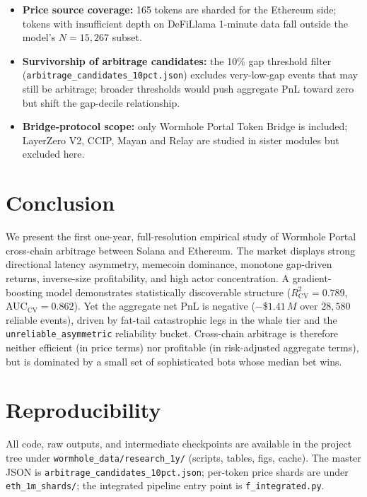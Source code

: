 \documentclass[11pt,a4paper]{article}
\begin{document}
\begin{itemize}
    \item \textbf{Price source coverage:} 165 tokens are sharded for the
        Ethereum side; tokens with insufficient depth on DeFiLlama 1-minute
        data fall outside the model's $N=15{,}267$ subset.
    \item \textbf{Survivorship of arbitrage candidates:} the 10\% gap
        threshold filter (\texttt{arbitrage\_candidates\_10pct.json}) excludes
        very-low-gap events that may still be arbitrage; broader thresholds
        would push aggregate PnL toward zero but shift the gap-decile
        relationship.
    \item \textbf{Bridge-protocol scope:} only Wormhole Portal Token Bridge
        is included; LayerZero V2, CCIP, Mayan and Relay are studied in
        sister modules but excluded here.
\end{itemize}

\section{Conclusion}\label{sec:conc}

We present the first one-year, full-resolution empirical study of Wormhole
Portal cross-chain arbitrage between Solana and Ethereum. The market displays
strong directional latency asymmetry, memecoin dominance, monotone
gap-driven returns, inverse-size profitability, and high actor concentration.
A gradient-boosting model demonstrates statistically discoverable structure
($R^{2}_{\text{CV}}=0.789$, AUC$_{\text{CV}}=0.862$). Yet the aggregate net
PnL is negative ($-\$1.41\,M$ over $28{,}580$ reliable events), driven by
fat-tail catastrophic legs in the whale tier and the
\texttt{unreliable\_asymmetric} reliability bucket. Cross-chain arbitrage is
therefore neither efficient (in price terms) nor profitable (in
risk-adjusted aggregate terms), but is dominated by a small set of
sophisticated bots whose median bet wins.

\section*{Reproducibility}

All code, raw outputs, and intermediate checkpoints are available in the
project tree under
\texttt{wormhole\_data/research\_1y/} (scripts, tables, figs, cache). The
master JSON is \texttt{arbitrage\_candidates\_10pct.json}; per-token price
shards are under \texttt{eth\_1m\_shards/}; the integrated pipeline entry
point is \texttt{f\_integrated.py}.
\end{document}
